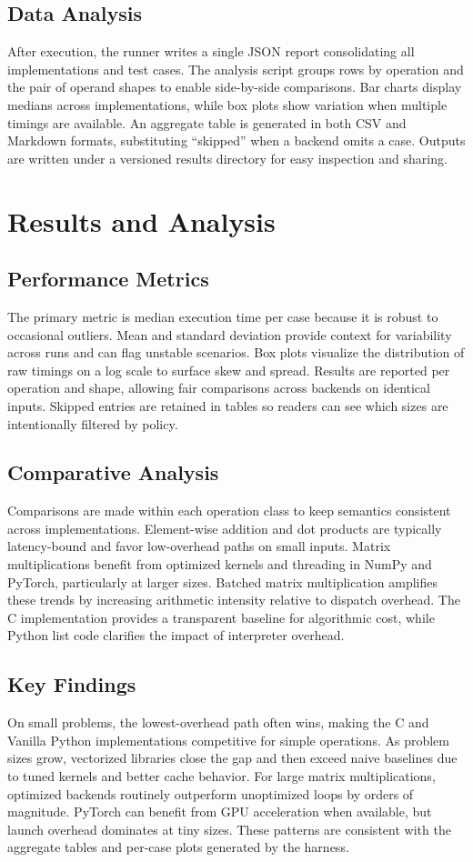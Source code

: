 \documentclass[a4paper,12pt]{article}
\begin{document}
\subsection{Data Analysis}
After execution, the runner writes a single JSON report consolidating all implementations and test cases. The analysis script groups rows by operation and the pair of operand shapes to enable side-by-side comparisons. Bar charts display medians across implementations, while box plots show variation when multiple timings are available. An aggregate table is generated in both CSV and Markdown formats, substituting “skipped” when a backend omits a case. Outputs are written under a versioned results directory for easy inspection and sharing.

\section{Results and Analysis}
\subsection{Performance Metrics}
The primary metric is median execution time per case because it is robust to occasional outliers. Mean and standard deviation provide context for variability across runs and can flag unstable scenarios. Box plots visualize the distribution of raw timings on a log scale to surface skew and spread. Results are reported per operation and shape, allowing fair comparisons across backends on identical inputs. Skipped entries are retained in tables so readers can see which sizes are intentionally filtered by policy.

\subsection{Comparative Analysis}
Comparisons are made within each operation class to keep semantics consistent across implementations. Element-wise addition and dot products are typically latency-bound and favor low-overhead paths on small inputs. Matrix multiplications benefit from optimized kernels and threading in NumPy and PyTorch, particularly at larger sizes. Batched matrix multiplication amplifies these trends by increasing arithmetic intensity relative to dispatch overhead. The C implementation provides a transparent baseline for algorithmic cost, while Python list code clarifies the impact of interpreter overhead.

\subsection{Key Findings}
On small problems, the lowest-overhead path often wins, making the C and Vanilla Python implementations competitive for simple operations. As problem sizes grow, vectorized libraries close the gap and then exceed naive baselines due to tuned kernels and better cache behavior. For large matrix multiplications, optimized backends routinely outperform unoptimized loops by orders of magnitude. PyTorch can benefit from GPU acceleration when available, but launch overhead dominates at tiny sizes. These patterns are consistent with the aggregate tables and per-case plots generated by the harness.
\end{document}
